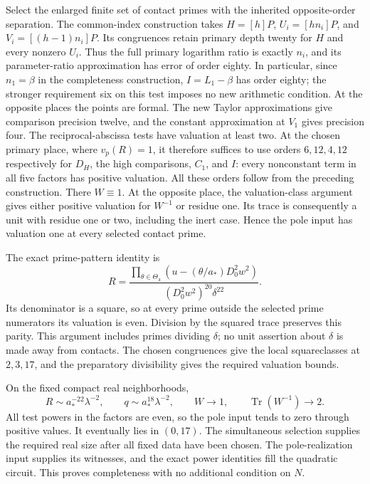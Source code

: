 \documentclass[11pt,a4paper]{article}
\DeclareMathOperator{\Tr}{Tr}\DeclareMathOperator{\Nm}{Nm}
\begin{document}
Select the enlarged finite set of contact primes with the inherited
opposite-order separation. The common-index construction takes $H=[h]P$,
$U_i=[hn_i]P$, and $V_i=[(h-1)n_i]P$. Its congruences retain primary
depth twenty for $H$ and every nonzero $U_i$. Thus the full primary
logarithm ratio is exactly $n_i$, and its parameter-ratio approximation
has error of order eighty. In particular, since $n_1=\beta$ in the
completeness construction, $I=L_1-\beta$ has order eighty; the stronger
requirement six on this test imposes no new arithmetic condition. At the opposite places the points are formal. The new
Taylor approximations give comparison precision twelve, and the
constant approximation at $V_1$ gives precision four. The reciprocal-abscissa tests have valuation at least two. At the
chosen primary place, where $v_p(R)=1$, it therefore suffices to use
orders $6,12,4,12$ respectively for $D_H$, the high comparisons,
$C_1$, and $I$: every nonconstant term in all five factors has
positive valuation. All these orders follow from the preceding
construction. There $W\equiv1$. At the opposite
place, the valuation-class argument gives either positive valuation
for $W^{-1}$ or residue one. Its trace is consequently a unit with
residue one or two, including the inert case. Hence the pole input
has valuation one at every selected contact prime.

The exact prime-pattern identity is
\[
 R=\frac{\displaystyle\prod_{\theta\in\Theta_4}
          (u-(\theta/a_*)D_0^2w^2)}
        {(D_0^2w^2)^{20}\delta^{22}}.
\]
Its denominator is a square, so at every prime outside the selected
prime numerators its valuation is even. Division by the squared trace
preserves this parity. This argument includes primes dividing $\delta$;
no unit assertion about $\delta$ is made away from contacts.
The chosen congruences give the local squareclasses at $2,3,17$,
and the preparatory divisibility gives the required valuation bounds.

On the fixed compact real neighborhoods,
\[
 R\sim a_*^{-22}\lambda^{-2},\qquad
 q\sim a_*^{18}\lambda^{-2},\qquad
 W\longrightarrow1,\qquad\Tr(W^{-1})\longrightarrow2.
\]
All test powers in the factors are even, so the pole input tends to
zero through positive values. It eventually lies in $(0,17)$.
The simultaneous selection supplies the required real size after all
fixed data have been chosen. The pole-realization input supplies its
witnesses, and the exact power identities fill the quadratic circuit.
This proves completeness with no additional condition on $N$.
\end{document}
